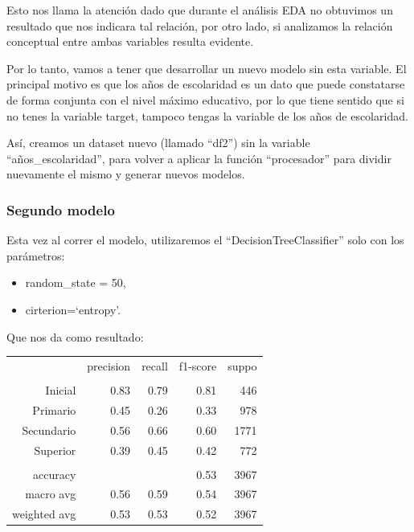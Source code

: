 \documentclass[a4paper]{article}
\begin{document}

            Esto nos llama la atención dado que durante el análisis EDA no obtuvimos un resultado que nos indicara tal relación, por otro lado, si analizamos la relación conceptual entre ambas variables resulta evidente.

            Por lo tanto, vamos a tener que desarrollar un nuevo modelo sin esta variable. El principal motivo es que los años de escolaridad es un dato que puede constatarse de forma conjunta con el nivel máximo educativo, por lo que tiene sentido que si no tenes la variable target, tampoco tengas la variable de los años de escolaridad.

            Así, creamos un dataset nuevo (llamado ``df2'') sin la variable ``años\_escolaridad'', para volver a aplicar la función ``procesador'' para dividir nuevamente el mismo y generar nuevos modelos.

        \subsubsection{Segundo modelo}

            Esta vez al correr el modelo, utilizaremos el ``DecisionTreeClassifier'' solo con los parámetros:
            \begin{itemize}
                \item random\_state = 50,
                \item cirterion=`entropy'.
            \end{itemize}
            Que nos da como resultado:  

            \begin{table}[!ht]
                \centering
                \begin{tabular}{rrrrr}
                    ~ & precision & recall & f1-score & suppo \\
                    & & & & \\
                    Inicial    & 0.83 & 0.79 & 0.81 & 446 \\
                    Primario   & 0.45 & 0.26 & 0.33 & 978 \\
                    Secundario & 0.56 & 0.66 & 0.60 & 1771 \\
                    Superior   & 0.39 & 0.45 & 0.42 & 772 \\
                    & & & & \\
                    accuracy & & & 0.53 & 3967 \\
                    macro avg & 0.56 & 0.59 & 0.54 & 3967 \\
                    weighted avg & 0.53 & 0.53 & 0.52 & 3967 \\
                \end{tabular}
            \end{table}
\end{document}

